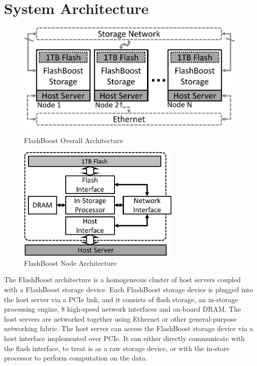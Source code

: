 \section{System Architecture}
\label{sec:architecture}

\begin{figure}[ht]
\centering
\vspace{0pt}
\begin{minipage}[c]{.4\paperwidth}
\begin{center}
	\includegraphics[width=\textwidth]{figures/architecture_small-crop.pdf}
	\caption{FlashBoost Overall Architecture}
	\label{fig:architecture}
\end{center}
\end{minipage}\hfill
\vspace{0pt}
\begin{minipage}[c]{.4\paperwidth}
\begin{center}
	\includegraphics[width=0.7\textwidth]{figures/architecture_node-crop.pdf}
	\caption{FlashBoost Node Architecture}
	\label{fig:architecture_node}
\end{center}
\end{minipage}
\end{figure}


The FlashBoost architecture is a homogeneous cluster of host servers coupled
with a FlashBoost storage device. Each FlashBoost storage device is plugged into
the host server via a PCIe link, and it consists of flash storage, an in-storage
processing engine, 8 high-speed network interfaces and on-board DRAM. The host
servers are networked together using Ethernet or other general-purpose
networking fabric. The host server can access the FlashBoost storage device via
a host interface implemented over PCIe. It can either directly communicate with
the flash interface, to treat is as a raw storage device, or with the in-store
processor to perform computation on the data.

